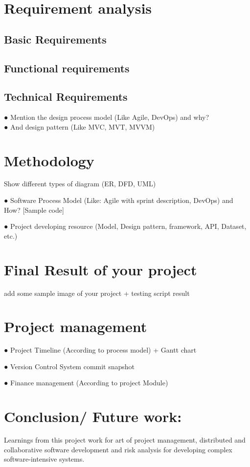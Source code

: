 \documentclass[10pt,a4paper]{extarticle}
\begin{document}
\section{Requirement analysis}
\subsection{Basic Requirements}
\subsection{Functional requirements}
\subsection{Technical Requirements}
● Mention the design process model (Like Agile, DevOps) and why?\\
● And design pattern (Like MVC, MVT, MVVM)

\section{Methodology}
Show different types of diagram (ER, DFD, UML)

● Software Process Model (Like: Agile with sprint description, DevOps) and How? [Sample code]

● Project developing resource (Model, Design pattern, framework, API, Dataset, etc.)


\section{Final Result of your project}
 add some sample image of your project + testing script result


\section{Project management}
● Project Timeline (According to process model) + Gantt chart

● Version Control System commit snapshot

● Finance management (According to project Module)


\section{Conclusion/ Future work:}
Learnings from this project work for art of project management, distributed and collaborative software development and risk analysis for developing complex software-intensive systems.
\end{document}
